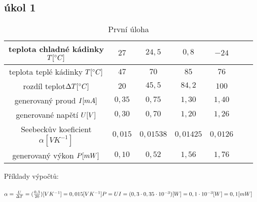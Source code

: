 \documentclass{article}
\begin{document}
\subsection{úkol 1}
\begin{minipage}[t]{\textwidth}
  \centering

  \begin{table}[H]
    \centering
    \begin{tabular}{|c|c|c|c|c|c|c|}
      \hline
      teplota chladné kádinky \(T\-[^\circ C]\) & \(27\)    & \(24,5\)    & \(0,8\)     & \(-24\)    \\ \hline
      teplota teplé kádinky \(T\-[^\circ C]\)	  & \(47\)	  & \(70\)	    & \(85\)	    & \(76\)	   \\ \hline
      rozdíl teplot\(\Delta T\-[^\circ C]\)	    & \(20\)	  & \(45,5\)    & \(84,2\)    & \(100\)	   \\ \hline
      generovaný proud \(I\-[mA]\)              & \(0,35\)  & \(0,75\)    & \(1,30\)    & \(1,40\)   \\ \hline
      generované napětí \(U\-[V]\)              & \(0,30\)  & \(0,70\)    & \(1,20\)    & \(1,26\)   \\ \hline
      Seebeckův koeficient \(\alpha [VK^{-1}]\) & \(0,015\) & \(0,01538\) & \(0,01425\) & \(0,0126\) \\ \hline
      generovaný výkon \(P\-[mW]\)              & \(0,10\)  & \(0,52\)    & \(1,56\)    & \(1,76\)   \\ \hline
    \end{tabular}
    \caption{\label{tabulka_mereni} První úloha}
  \end{table}
\end{minipage}

Příklady výpočtů: \\
\\
\large
\(
  \alpha = \frac{U}{\Delta T} = (\frac{0,3}{20})\-[VK^{-1}] = 0,015\-[VK^{-1}] \\ \\
  P = UI = (0,3 \cdot 0,35\cdot10^{-3})\-[W] = 0,1\cdot10^{-3}\-[W] = 0,1\-[mW]  \\ \\
\)
\normalsize \\
\end{document}
